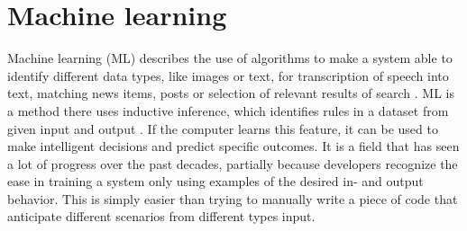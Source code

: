 \section{Machine learning}



Machine learning (ML) describes the use of algorithms to make a system able to identify different data types, like images or text, for transcription of speech into text, matching news items, posts or selection of relevant results of search \citep{LeCun2015}.
ML is a method there uses inductive inference, which identifies rules in a dataset from given input and output \citep{Nielsen2010}. If the computer learns this feature, it can be used to make intelligent decisions and predict specific outcomes. \citep{Nielsen2010}
It is a field that has seen a lot of progress over the past decades, partially because developers recognize the ease in training a system only using examples of the desired in- and output behavior. This is simply easier than trying to manually write a piece of code that anticipate different scenarios from different types input. \citep{Jordan2015}


